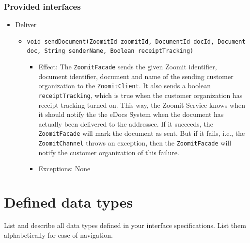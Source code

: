 \documentclass[a4paper,10pt]{article}
\begin{document}
\subsubsection*{Provided interfaces}
\begin{itemize}
    \item Deliver
    \begin{itemize}
        \item \texttt{void sendDocument(ZoomitId zoomitId, DocumentId docId, Document doc, String senderName, Boolean receiptTracking)}
        \begin{itemize}
            \item Effect: The \texttt{ZoomitFacade} sends the given Zoomit identifier, document identifier,  document and name of the sending customer organization to the \texttt{ZoomitClient}. It also sends a boolean \texttt{receiptTracking}, which is true when the customer organization has receipt tracking turned on. This way, the Zoomit Service knows when it should notify the the eDocs System when the document has actually been delivered to the addressee. If it succeeds, the \texttt{ZoomitFacade} will mark the document as sent. But if it fails, i.e., the \texttt{ZoomitChannel} throws an exception, then the \texttt{ZoomitFacade} will notify the customer organization of this failure.
            \item Exceptions: None
		\end{itemize}
    \end{itemize}
\end{itemize}



\section{Defined data types}\label{app:datatypes}
List and describe all data types defined in your interface specifications. List
them alphabetically for ease of navigation.
\end{document}
